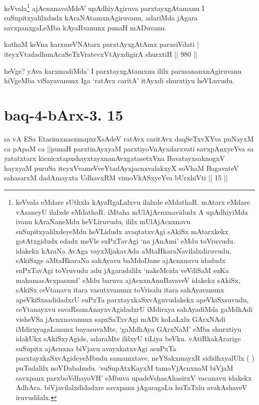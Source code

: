 \begin{artha}
keVvala\footnote{keVvala eMdare sUthxla kAyaRgaLalxvu ilalxde eMdathaR. mAtarx eMdare vAsaneyU ilalxde eMdathaR. iMtaha mUlAjAcnxnavidudx A upAdhiyiMda ivanu kAraNaneMdu heVLiruvudu, ililx mUlAjAcnxnavu suSupitxyalilxdeyeMdu heVLidudx avaqtatxvAgi sAkiSx mAtarxkekx gotAtxgidudx edadx meVle suPxTavAgi `na jAnAmi' eMdu toVruvudu. idakekx kAraNa AvAga vayxMjakavAda aMtaHkaraNavilalxdiruvudu, sAkiSxge aMtaHkaraNa sahAyavu baMdoDane ajAcnxnavu idadudx suPxTavAgi toVruvudu adu jAgaradalilx `nakeMcida veVdiSaM suKa mahamasAvxpasxmf' eMdu baruva ajAcnxnAnuBavaveV idakekx sAkiSx, sAkiSx ceVtanavu itara vasutxvanunx toVrisalu itara sahAyavanunx apeVkiSxsadidadxrU suPxTa parxtayxkaSxvAguvudakekx apeVkiSxsuvudu, ceYtanayxvu savaRsamAnayxvAgidadxrU iMdirxya sahAyadiMda gaMdhAdi visheVSa jAcnxnavanunx sapxSaTxvAgi mADi koLaLxlu GArxNAdi iMdirxyagaLanunx bayasuvaMte, `gaMdhAya GArxNaM' eMba shurxtiyu idakUkx sAkiSxyAgide, adaraMte ililxyU tiLiya beVku. vAtiRkakArarige suSupitx ajAcnxna biVjavu avayxkatxvAgi asuPxTa parxtayxkaSxvAgideyeMbudu samamxtave, neYSakxmayxR sididhxyalUlx (   ) puTadalilx noVDabahudu. `suSupAtxKayxM tamoV\s jAcnxnaM biVjaM savxpanx parxboVdhayoVH' eMbuva upadeVshasAhasirxV vacanavu idakekx AdhAra. biVjavilalxdidadxre savxpanx jAgaragaLu huTaTxlu avakAshaveV iruvudilalx.} ajAcnxnavoMdeV upAdhiyAgiruva parxtayxgAtamxnu I suSupitxyalilxdudx kAraNAtamxnAgiruvanu, adariMda jAgara savxpanxgaLeMba kAyaRvanunx punaH mADuvanu.
\end{artha}

\begin{shl}
kathaM keVna karxmeVNAtarx parxtAyxgAtAmx parxsiVdati | \\
iteyxVtadadhunA\s \s caSeTxVratevxVtAyxdigirA shurxtiH \hfill||  980 ||  
\end{shl}

\begin{artha}
heVge? yAva karxmadiMda' I parxtayxgAtamxnu ililx parxsananxnAgiruvanu hiVgeMba viSayavanunx Iga `ratAvx caritA' itAyxdi shurxtiyu heVLuvudu.
\end{artha}

\section*{baq-4-bArx-3. 15}

\begin{shl}
sa vA ESa EtasimxnasxmapxrXsAdeV ratAvx caritAvx daqSeTxvXYva puNayxM ca pApaM ca ||punaH parxtinAyxyaM parxtiyoVnAyxdarxvati savxpAnxyeYva sa yatatxtarx kicnicxtapxshayxtayxnanAvxgatasetxVna BavatayxsaknogxV hayxyaM puruSa iteyxVvameVveYtadAyxjacnxvalakxyX soV\s haM BagavateV sahasarxM dadAmayxta UdhavxRM vimoVkASxyeYva bUrxhiVti || 15 ||
\end{shl}

